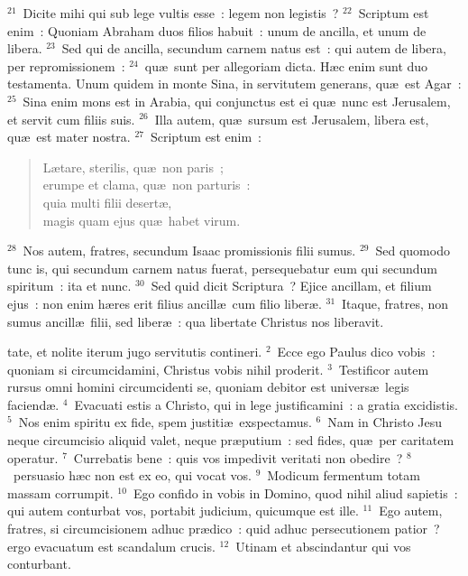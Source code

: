 ${}^{21}$~Dicite mihi qui sub lege vultis esse~: legem non legistis~?
${}^{22}$~Scriptum est enim~: Quoniam Abraham duos filios habuit~: unum de ancilla, et unum de libera.
${}^{23}$~Sed qui de ancilla, secundum carnem natus est~: qui autem de libera, per repromissionem~:
${}^{24}$~qu\ae\ sunt per allegoriam dicta. H\ae c enim sunt duo testamenta. Unum quidem in monte Sina, in servitutem generans, qu\ae\ est Agar~:
${}^{25}$~Sina enim mons est in Arabia, qui conjunctus est ei qu\ae\ nunc est Jerusalem, et servit cum filiis suis.
${}^{26}$~Illa autem, qu\ae\ sursum est Jerusalem, libera est, qu\ae\ est mater nostra.
${}^{27}$~Scriptum est enim~: \begin{verse}L\ae tare, sterilis, qu\ae\ non paris~;\\ erumpe et clama, qu\ae\ non parturis~:\\ quia multi filii desert\ae ,\\ magis quam ejus qu\ae\ habet virum.\end{verse}


${}^{28}$~Nos autem, fratres, secundum Isaac promissionis filii sumus.
${}^{29}$~Sed quomodo tunc is, qui secundum carnem natus fuerat, persequebatur eum qui secundum spiritum~: ita et nunc.
${}^{30}$~Sed quid dicit Scriptura~? Ejice ancillam, et filium ejus~: non enim h\ae res erit filius ancill\ae\ cum filio liber\ae .
${}^{31}$~Itaque, fratres, non sumus ancill\ae\ filii, sed liber\ae~: qua libertate Christus nos liberavit.

\bchapter
{}tate, et nolite iterum jugo servitutis contineri.
${}^{2}$~Ecce ego Paulus dico vobis~: quoniam si circumcidamini, Christus vobis nihil proderit.
${}^{3}$~Testificor autem rursus omni homini circumcidenti se, quoniam debitor est univers\ae\ legis faciend\ae .
${}^{4}$~Evacuati estis a Christo, qui in lege justificamini~: a gratia excidistis.
${}^{5}$~Nos enim spiritu ex fide, spem justiti\ae\ exspectamus.
${}^{6}$~Nam in Christo Jesu neque circumcisio aliquid valet, neque pr\ae putium~: sed fides, qu\ae\ per caritatem operatur.
${}^{7}$~Currebatis bene~: quis vos impedivit veritati non obedire~?
${}^{8}$~persuasio h\ae c non est ex eo, qui vocat vos.
${}^{9}$~Modicum fermentum totam massam corrumpit.
${}^{10}$~Ego confido in vobis in Domino, quod nihil aliud sapietis~: qui autem conturbat vos, portabit judicium, quicumque est ille.
${}^{11}$~Ego autem, fratres, si circumcisionem adhuc pr\ae dico~: quid adhuc persecutionem patior~? ergo evacuatum est scandalum crucis.
${}^{12}$~Utinam et abscindantur qui vos conturbant.


